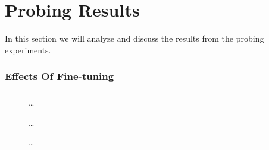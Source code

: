 \chapter{Probing Results}
\label{chap:results}
In this section we will analyze and discuss the results from the probing experiments.

\subsection{Effects Of Fine-tuning}

\subsection{}
\begin{figure}%
    \centering
    \caption{\dots}
\end{figure}

\begin{figure}
    \centering
    \caption{\dots }
\end{figure}

\begin{figure}
    \centering
    \caption{\dots}
\end{figure}



